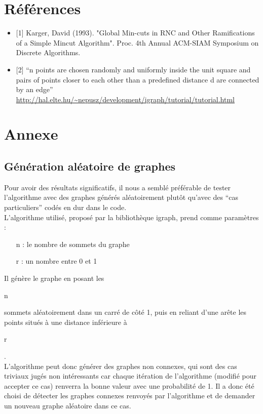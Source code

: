 \documentclass[a4paper,10pt]{article}
\begin{document}
\section{Références}

\begin{itemize}
  \item {[}1] Karger, David (1993). "Global Min-cuts in RNC and Other Ramifications of a Simple Mincut Algorithm". Proc. 4th Annual ACM-SIAM Symposium on Discrete Algorithms.
  \item {[}2] ``n points are chosen randomly and uniformly inside the unit square and pairs of points closer to each other than a predefined distance d are connected by an edge'' \url{http://hal.elte.hu/~nepusz/development/igraph/tutorial/tutorial.html}
\end{itemize}


\section{Annexe}
\subsection{Génération aléatoire de graphes}

Pour avoir des résultats significatifs, il nous a semblé préférable de tester l'algorithme avec des graphes générés aléatoirement plutôt qu'avec des ``cas particuliers'' codés en dur dans le code.\\

L'algorithme utilisé, proposé par la bibliothèque igraph, prend comme paramètres :
\begin{itemize}
 \item[n] : le nombre de sommets du graphe
 \item[r] : un nombre entre 0 et 1
\end{itemize}
Il génère le graphe en posant les \begin{it}n\end{it} sommets aléatoirement dans un carré de côté 1, puis en reliant d'une arête les points situés à une distance inférieure à \begin{it}r\end{it}.\\

L'algorithme peut donc générer des graphes non connexes, qui sont des cas triviaux jugés non intéressants car chaque itération de l'algorithme (modifié pour accepter ce cas) renverra la bonne
valeur avec une probabilité de 1. Il a donc été choisi de détecter les graphes connexes renvoyés par l'algorithme et de demander un nouveau graphe aléatoire dans ce cas.\\
\end{document}
